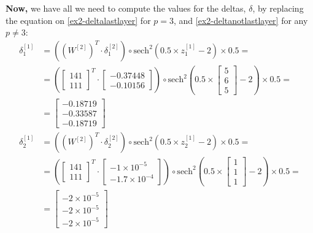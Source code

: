 \documentclass[12pt]{article}
\begin{document}
\begin{enumerate}[leftmargin=\labelsep]
        \textbf{Now,} we have all we need to compute the values for the deltas, $\delta$, by replacing the equation on \eqref{ex2-deltalastlayer} for $p=3$,
        and \eqref{ex2-deltanotlastlayer} for any $p \neq 3$:
        \begingroup
        \allowdisplaybreaks
          \begin{align*}
              \delta^{[1]}_1 &= \left(\left(W^{[2]}\right)^{T} \cdot \delta^{[2]}_1\right) \circ \text{sech}^{2}\left(0.5 \times z^{[1]}_1 - 2\right) \times 0.5 = \\
             &= \left(\begin{bmatrix} 1 4 1 \\ 1 1 1 \end{bmatrix}^{T} \cdot \begin{bmatrix} -0.37448 \\ -0.10156 \end{bmatrix}\right) \circ \text{sech}^{2}\left(0.5 \times \begin{bmatrix}  5 \\ 6 \\ 5 \end{bmatrix} - 2\right) \times 0.5 = \\
             &= \begin{bmatrix} -0.18719 \\ -0.33587 \\ -0.18719\end{bmatrix} \\
                 \delta^{[1]}_2 &= \left(\left(W^{[2]}\right)^{T} \cdot \delta^{[2]}_2\right) \circ  \text{sech}^{2}\left(0.5\times z^{[1]}_2 - 2\right) \times 0.5 = \\
             &= \left(\begin{bmatrix} 1 4 1 \\ 1 1 1 \end{bmatrix}^{T} \cdot \begin{bmatrix} -1 \times 10^{-5} \\ -1.7 \times 10^{-4} \end{bmatrix}\right) \circ \text{sech}^{2}\left(0.5\times\begin{bmatrix}  1 \\ 1 \\ 1 \end{bmatrix} - 2\right) \times 0.5 = \\
             &= \begin{bmatrix} -2 \times 10^{-5} \\ -2 \times 10^{-5} \\ -2 \times 10^{-5}\end{bmatrix}
          \end{align*}
        \endgroup


\end{enumerate}
\end{document}
